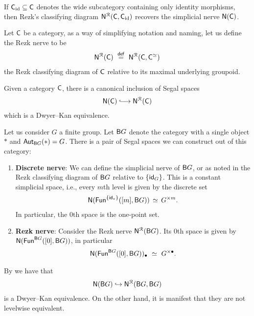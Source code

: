 \begin{observation}\label{ch2:: obs: nerves agree}
If $\mathsf C_{\mathrm{id}}\subseteq \mathsf C$ denotes the wide subcategory containing
only identity morphisms, then Rezk's classifying diagram
$\mathsf N^{\mathcal R}(\mathsf C,\mathsf C_{\mathrm{id}})$ recovers the simplicial nerve $\mathsf N(\mathsf C)$.
\end{observation}


\begin{definition}
    Let $\mathsf C$ be a category, as a way of simplifying notation and naming, let us define the Rezk nerve to be \[\mathsf N^{\mathcal R}(\mathsf C) \,\, \overset{\sf def}{=} \,\, \mathsf N^{\mathcal R}(\mathsf C,\mathsf C^{\simeq})\] the Rezk classifying diagram of $\mathsf C$ relative to its maximal underlying groupoid.
\end{definition}


\begin{proposition}\label{ch2:: prop: Rezk nerve equiv disc nerve}\cite[Proposition 2.2.16]{Zha13}
Given a category $\mathsf C$, there is a canonical inclusion of Segal spaces 
\begin{equation}
    \sN(\sC) \xlonghookra{\,\,\,\,} \sN^{\cR}(\sC)
\end{equation}    
which is a Dwyer--Kan equivalence.
\end{proposition}



\begin{example}\label{ch2:: ex: need complete}
    Let us consider $G$ a finite group. Let $\mathsf B G$ denote the category with a single object $*$ and $\operatorname{\sf Aut}_{\mathsf B G}(*) = G$. There is a pair of Segal spaces we can construct out of this category:
\begin{enumerate}
    \item \textbf{Discrete nerve}: We can define the simplicial nerve of $\mathsf B G$, or as noted in  the Rezk classifying diagram of $\mathsf B G$ relative to $\{\operatorname{\sf id}_G\}$. This is a constant simplicial space, i.e., every $m$th level is given by the discrete set \[\mathsf N(\operatorname{\sf Fun}^{\{\operatorname{\sf id}_* \}}([m],\mathsf B G))\,\simeq\, G^{\times m}.\] In particular, the $0$th space is the one-point set.
    \item \textbf{Rezk nerve}: Consider the Rezk nerve $\mathsf N^{\mathcal R}(\mathsf B G)$. Its $0$th space is given by $\mathsf N(\operatorname{\sf Fun}^{\mathsf B G}([0],\mathsf B G))$, in particular 
    \begin{equation}
        \mathsf N(\operatorname{\sf Fun}^{\mathsf B G}([0],\mathsf B G))_{\bullet} \,\, \simeq \,\, G^{\times \bullet}.
    \end{equation} 
\end{enumerate}

\nid By  we have that 
\begin{equation}
    \mathsf N(\mathsf B G) \hookrightarrow \mathsf N^{\mathcal R}(\mathsf B G, \mathsf B G)
\end{equation}
is a Dwyer--Kan equivalence. On the other hand, it is manifest that they are not levelwise equivalent.
\end{example}

